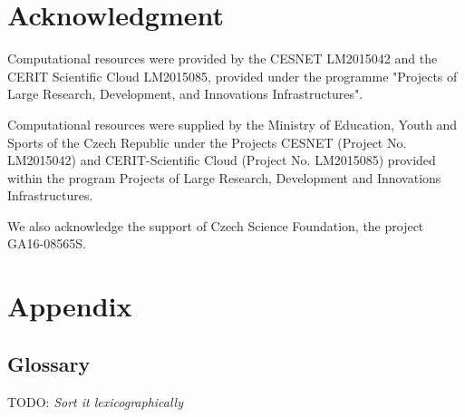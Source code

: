 \documentclass[
  print, %
  Table,   %
  nolof,     %
  nolot,     %
  11pt, %
  oneside  %
]{fithesis3}
\newcommand{\todo}[1]{TODO: \textit{#1}}
\begin{document}
\chapter*{Acknowledgment}
\label{chap:ack}

Computational resources were provided by the CESNET LM2015042 and the CERIT Scientific Cloud LM2015085, provided under the programme "Projects of Large Research, Development, and Innovations Infrastructures".

Computational resources were supplied by the Ministry of Education, Youth and Sports of the Czech Republic under the Projects CESNET (Project No. LM2015042) and CERIT-Scientific Cloud (Project No. LM2015085) provided within the program Projects of Large Research, Development and Innovations Infrastructures.

We also acknowledge the support of Czech Science Foundation, the project GA16-08565S.


\printbibliography[heading=bibintoc] %

\chapter*{Appendix}
\label{chap:app}

\section{Glossary}
\label{sec:app-glos}

\todo{Sort it lexicographically}
\end{document}
